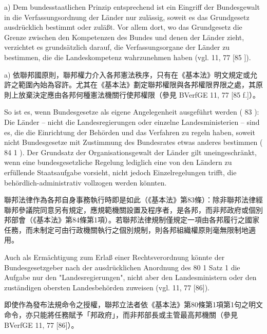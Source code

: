 \documentclass[12pt]{article}
\begin{document}
\begin{sourcepara}[title={原文E.251}]
a) Dem bundesstaatlichen Prinzip entsprechend ist ein Eingriff der Bundesgewalt in die Verfassungsordnung der Länder nur zulässig, soweit es das Grundgesetz ausdrücklich bestimmt oder zuläßt. Vor allem dort, wo das Grundgesetz die Grenze zwischen den Kompetenzen des Bundes und denen der Länder zieht, verzichtet es grundsätzlich darauf, die Verfassungsorgane der Länder zu bestimmen, die die Landeskompetenz wahrzunehmen haben (vgl. \abbrBVerfGE{} 11, 77 [85 \abbrF{}]).
\end{sourcepara}
\begin{transpara}
a) 依聯邦國原則，聯邦權力介入各邦憲法秩序，只有在《基本法》明文規定或允許之範圍內始為容許。尤其在《基本法》劃定聯邦權限與各邦權限界限之處，其原則上放棄決定應由各邦何種憲法機關行使邦權限（參見 BVerfGE 11, 77 [85 f.]）。
\end{transpara}

\begin{sourcepara}[title={原文E.252}]
So ist es, wenn Bundesgesetze als eigene Angelegenheit ausgeführt werden (\abbrArt{} 83 \abbrGG{}\ggfnArtEightyThreeDE{}): Die Länder -- nicht die Landesregierungen oder einzelne Landesministerien -- sind es, die die Einrichtung der Behörden und das Verfahren zu regeln haben, soweit nicht Bundesgesetze mit Zustimmung des Bundesrates etwas anderes bestimmen (\abbrArt{} 84 \abbrAbs{} 1 \abbrGG{}\ggfnArtEightyFourOneDE{}). Der Grundsatz der Organisationsgewalt der Länder gilt uneingeschränkt, wenn eine bundesgesetzliche Regelung lediglich eine von den Ländern zu erfüllende Staatsaufgabe vorsieht, nicht jedoch Einzelregelungen trifft, die behördlich-administrativ vollzogen werden könnten.
\end{sourcepara}
\begin{transpara}
聯邦法律作為各邦自身事務執行時即是如此（《基本法》第83條\ggfnArtEightyThreeZH{}）：除非聯邦法律經聯邦參議院同意另有規定，應規範機關設置及程序者，是各邦，而非邦政府或個別邦部會（《基本法》第84條第1項\ggfnArtEightyFourOneZH{}）。若聯邦法律規制僅規定一項由各邦履行之國家任務，而未制定可由行政機關執行之個別規制，則各邦組織權原則毫無限制地適用。
\end{transpara}

\begin{sourcepara}[title={原文E.253}]
Auch als Ermächtigung zum Erlaß einer Rechtsverordnung könnte der Bundesgesetzgeber nach der ausdrücklichen Anordnung des \abbrArt{} 80 \abbrAbs{} 1 Satz 1 \abbrGG{}\ggfnArtEightyOneOneDE{} die Aufgabe nur den "Landesregierungen", nicht aber den Landesministern oder den zuständigen obersten Landesbehörden zuweisen (vgl. \abbrBVerfGE{} 11, 77 [86]).
\end{sourcepara}
\begin{transpara}
即使作為發布法規命令之授權，聯邦立法者依《基本法》第80條第1項第1句\ggfnArtEightyOneOneZH{}之明文命令，亦只能將任務賦予「邦政府」，而非邦部長或主管最高邦機關（參見 BVerfGE 11, 77 [86]）。
\end{transpara}
\end{document}
